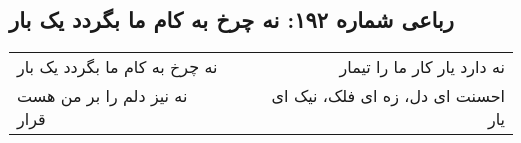 \begin{center}
\section*{رباعی شماره ۱۹۲: نه چرخ به کام ما بگردد یک بار}
\label{sec:sh192}
\begin{longtable}{l p{0.5cm} r}
نه چرخ به کام ما بگردد یک بار
&&
نه دارد یار کار ما را تیمار
\\
نه نیز دلم را بر من هست قرار
&&
احسنت ای دل، زه ای فلک، نیک ای یار
\\
\end{longtable}
\end{center}

